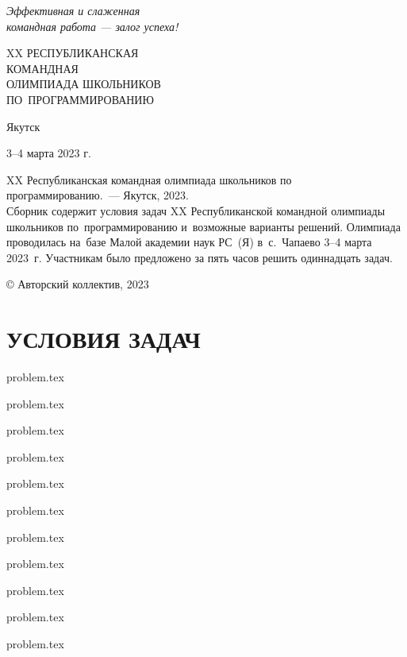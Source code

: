 \documentclass[a5paper, twoside, 11pt]{article}
\begin{document}
\pagestyle{empty}

\begin{flushright}
\hfill
\it
Эффективная и слаженная\\
командная работа --- залог успеха!
\end{flushright}
\vskip5cm

\begin{center}
\huge
XX РЕСПУБЛИКАНСКАЯ \\КОМАНДНАЯ\\ОЛИМПИАДА ШКОЛЬНИКОВ \\
ПО~ПРОГРАММИРОВАНИЮ
\end{center}

\vfill
\centerline{Якутск}
\centerline{3--4 марта 2023 г.}
\newpage
\noindent XX Республиканская командная олимпиада школьников по программированию.~--- Якутск, 2023.
\\[5mm]
Сборник содержит условия задач XX Республиканской командной олимпиады школьников по~программированию 
и~возможные варианты решений. Олимпиада проводилась на~базе Малой академии наук РС~(Я) в~с.~Чапаево
3--4 марта 2023~г. Участникам было предложено за пять часов решить одиннадцать задач.
\vfill

{}\hfill © Авторский коллектив, 2023







\pagestyle{fancy}

\newpage
\rm
\thispagestyle{plain}
\section*{УСЛОВИЯ ЗАДАЧ}

\newcommand{\importproblem}[1]{
\graphicspath{{problems/#1/statements/russian/}}
{problem.tex}	
}

\importproblem{prizes}
\importproblem{idiocracy}
\importproblem{robot-gardener}
\importproblem{simple-game}
\importproblem{rectangle-coloring}
\importproblem{foodshop-2}
\importproblem{interview-at-fun-club}
\importproblem{relay-race-with-weight}
\importproblem{suburban-grasshoppers}
\importproblem{pills}
\importproblem{debt-evasion}
\end{document}
